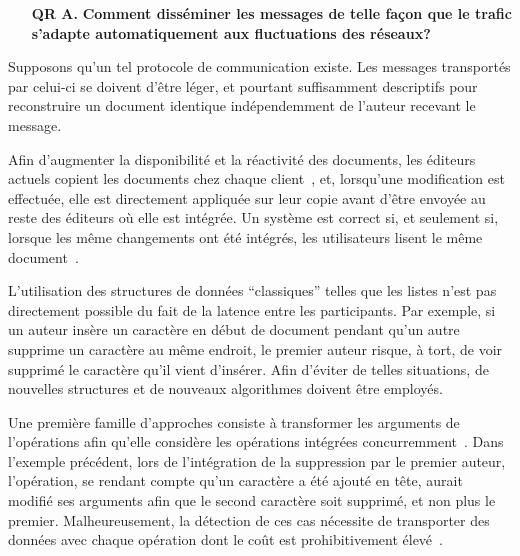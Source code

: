 \begin{itemize}
  \begin{itemize}
  \item [\textbf{QR A.}] \textbf{Comment disséminer les messages de telle façon
      que le trafic s'adapte automatiquement aux fluctuations des réseaux?}
  \end{itemize}

  Supposons qu'un tel protocole de communication existe. Les messages
  transportés par celui-ci se doivent d'être léger, et pourtant suffisamment
  descriptifs pour reconstruire un document identique indépendemment de l'auteur
  recevant le message.

  Afin d'augmenter la disponibilité et la réactivité des documents, les éditeurs
  actuels copient les documents chez chaque client~\cite{saito2005optimistic},
  et, lorsqu'une modification est effectuée, elle est directement appliquée sur
  leur copie avant d'être envoyée au reste des éditeurs où elle est intégrée. Un
  système est correct si, et seulement si, lorsque les même changements ont été
  intégrés, les utilisateurs lisent le même
  document~\cite{burckhardt2014replicated, shapiro2011conflict}.

  L'utilisation des structures de données ``classiques'' telles que les listes
  n'est pas directement possible du fait de la latence entre les
  participants. Par exemple, si un auteur insère un caractère en début de
  document pendant qu'un autre supprime un caractère au même endroit, le premier
  auteur risque, à tort, de voir supprimé le caractère qu'il vient
  d'insérer. Afin d'éviter de telles situations, de nouvelles structures et de
  nouveaux algorithmes doivent être employés.

  Une première famille d'approches consiste à transformer les arguments de
  l'opérations afin qu'elle considère les opérations intégrées
  concurremment~\cite{sun1998operational}. Dans l'exemple précédent, lors de
  l'intégration de la suppression par le premier auteur, l'opération, se rendant
  compte qu'un caractère a été ajouté en tête, aurait modifié ses arguments afin
  que le second caractère soit supprimé, et non plus le
  premier. Malheureusement, la détection de ces cas nécessite de transporter des
  données avec chaque opération dont le coût est prohibitivement
  élevé~\cite{sun2009contextbased}.


\end{itemize}
